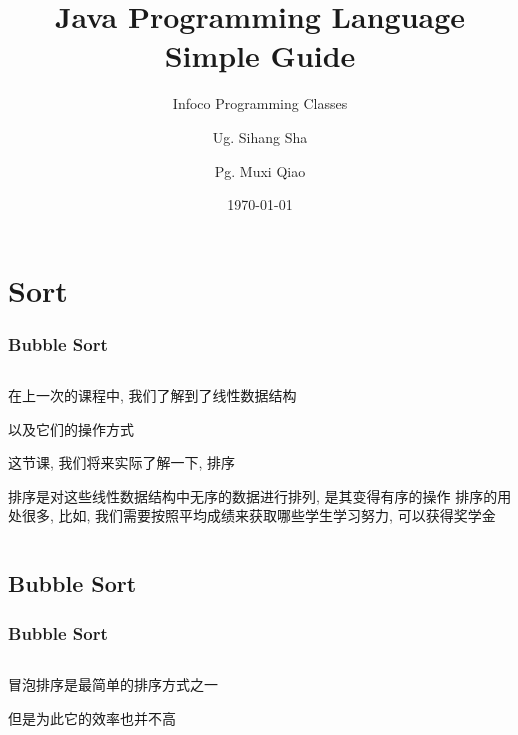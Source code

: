 \documentclass[en, 11pt, xcolor=dvipsnames]{beamer}
\title{Java Programming Language \\ Simple Guide} %
\subtitle{Infoco Programming Classes} %
\author{Ug. Sihang Sha \and Pg. Muxi Qiao} %
\institute{Xiann' Jiaotong Livepool University \\ \smallskip \textit{infoco@xjtlu.edu.cn}} %
\date{\today} %
\begin{document}
\maketitle


\section{Sort}
\begin{frame}[fragile]
	\frametitle{Bubble Sort}


	\begin{columns}[c]
		\begin{column}{0.98\textwidth}

			在上一次的课程中, 我们了解到了线性数据结构

			以及它们的操作方式

			这节课, 我们将来实际了解一下, 排序

			排序是对这些线性数据结构中无序的数据进行排列, 是其变得有序的操作
			排序的用处很多, 比如, 我们需要按照平均成绩来获取哪些学生学习努力,
			可以获得奖学金

		\end{column}
	\end{columns}

\end{frame}

\subsection{Bubble Sort}
\begin{frame}[fragile]
	\frametitle{Bubble Sort}


	\begin{columns}[c]
		\begin{column}{0.98\textwidth}
			冒泡排序是最简单的排序方式之一

			但是为此它的效率也并不高

		\end{column}
	\end{columns}

\end{frame}
\end{document}
